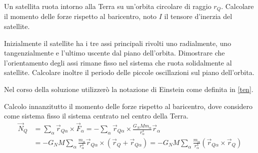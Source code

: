 \documentclass[../main.tex]{subfiles}
\begin{document}
\label{ex:crc}

\textex
Un satellita ruota intorno alla Terra su un'orbita circolare di raggio $r_Q$. Calcolare il momento delle forze rispetto al baricentro, noto $I$ il tensore d'inerzia del satellite. 

Inizialmente il satellite ha i tre assi principali rivolti uno radialmente, uno tangenzialmente e l'ultimo uscente dal piano dell'orbita. Dimostrare che l'orientamento degli assi rimane fisso nel sistema che ruota solidalmente al satellite. Calcolare inoltre il periodo delle piccole oscillazioni sul piano dell'orbita.

\solution
Nel corso della soluzione utilizzerò la notazione di Einstein come definita in \cref{ten}.

Calcolo innanzitutto il momento delle forze rispetto al baricentro, dove considero come sistema fisso il sistema centrato nel centro della Terra.
\begin{equation}\label{crc:MomentoForze1}
\begin{split}
	\vec N_Q	&= \sum_\alpha\vec r_{Q\alpha} \times \vec F_\alpha=- \sum_\alpha \vec r_{Q\alpha} \times \frac {G_N M m_\alpha }{r_\alpha^3}\vec r_\alpha \\
			&= -G_NM \sum_\alpha \frac {m_\alpha}{r_\alpha^3}\vec r_{Q\alpha} \times (\vec r_Q+\vec r_{Q\alpha})=-G_NM \sum_\alpha \frac {m_\alpha}{r_\alpha^3}(\vec r_{Q\alpha} \times \vec r_Q)
\end{split}
\end{equation}
\end{document}
